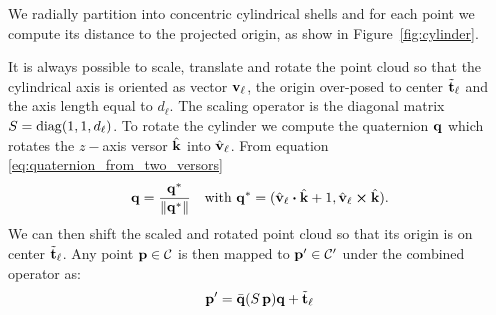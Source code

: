 We radially partition into concentric cylindrical shells and for each point we compute its distance to the projected origin, as show in Figure~\ref{fig:cylinder}.

It is always possible to scale, translate and rotate the point cloud so that the cylindrical axis is oriented as vector $\boldsymbol{\mathbf{v}}_{\ell}$, the origin over-posed to center $\tilde{\boldsymbol{\mathbf{t}}}_{\ell}$ and the axis length equal to $d_{\ell}$.
The scaling operator is the diagonal matrix $S = \operatorname{diag}(1, 1, d_{\ell})$.
To rotate the cylinder we compute the quaternion $\mathbf{q}$ which rotates the $z-$axis versor $\hat{\boldsymbol{\mathbf{k}}}$ into $\hat{\boldsymbol{\mathbf{v}}}_{\ell}$. From equation \eqref{eq:quaternion_from_two_versors}
\begin{equation}
  \quat{q} = \frac{\quat{q^*}}{\norm{\quat{q^*}}} \quad \text{with }
  \quat{q^*} = (\hat{\vect{v}}_{\ell} \vdot \hat{\vect{k}} + 1, \hat{\vect{v}}_{\ell} \cross \hat{\vect{k}}).
\end{equation}
We can then shift the scaled and rotated point cloud so that its origin is on center $\tilde{\boldsymbol{\mathbf{t}}}_{\ell}$.
Any point $\boldsymbol{\mathbf{p}} \in \mathcal{C}$ is then mapped to $\boldsymbol{\mathbf{p}}' \in \mathcal{C}'$ under the combined operator as:
\begin{equation}\label{eq:cylOperator}
  \boldsymbol{\mathbf{p}}' = \bar{\mathbf{q}}(S\,\boldsymbol{\mathbf{p}})\mathbf{q} + \tilde{\boldsymbol{\mathbf{t}}}_\ell
\end{equation}

